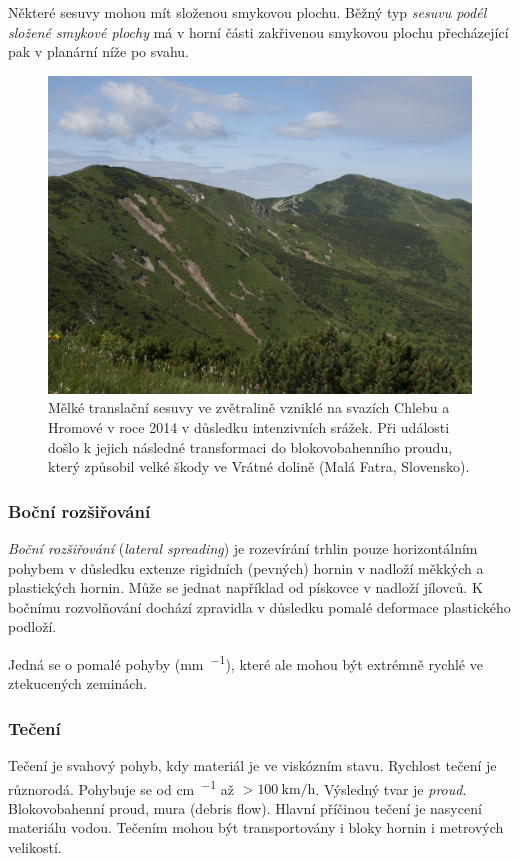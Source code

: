 Některé sesuvy mohou mít složenou smykovou plochu. Běžný typ \emph{sesuvu podél složené smykové plochy} má v horní části zakřivenou smykovou plochu přecházející pak v planární níže po svahu.
\begin{figure}
	\centering
	\includegraphics[width=1\linewidth]{obrazky/slope/melke}
	\caption{Mělké translační sesuvy ve zvětralině vzniklé na svazích Chlebu a Hromové v roce 2014 v důsledku intenzivních srážek. Při události došlo k jejich následné transformaci do blokovobahenního proudu, který způsobil velké škody ve Vrátné dolině (Malá Fatra, Slovensko).}
	\label{fig:melke}
\end{figure}

\subsubsection{Boční rozšiřování}
\emph{Boční rozšiřování} (\textit{lateral spreading}) je rozevírání trhlin pouze horizontálním pohybem v důsledku extenze rigidních (pevných) hornin v nadloží měkkých a plastických hornin. Může se jednat například od pískovce v nadloží jílovců. K bočnímu rozvolňování dochází zpravidla v důsledku pomalé deformace plastického podloží. 

Jedná se o pomalé pohyby (\si{\milli\metre\per\rok}), které ale mohou být extrémně rychlé ve ztekucených zeminách.

\subsubsection{Tečení}
Tečení je svahový pohyb, kdy materiál je ve viskózním stavu. Rychlost tečení je různorodá. Pohybuje se od \si{\centi\metre\per\den} až $>\SI{100}{\kilo\metre\per\hour}$. Výsledný tvar je \emph{proud}. Blokovobahenní proud, mura (debris flow). Hlavní příčinou tečení je nasycení materiálu vodou. Tečením mohou být transportovány i bloky hornin i metrových velikostí. 


